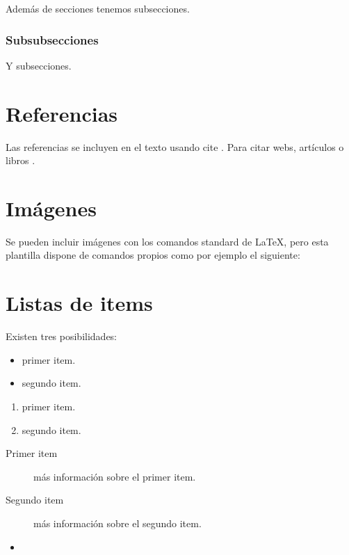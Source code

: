 Además de secciones tenemos subsecciones.

\subsubsection{Subsubsecciones}

Y subsecciones. 


\section{Referencias}

Las referencias se incluyen en el texto usando cite \cite{wiki:latex}. Para citar webs, artículos o libros \cite{koza92}.


\section{Imágenes}

Se pueden incluir imágenes con los comandos standard de \LaTeX, pero esta plantilla dispone de comandos propios como por ejemplo el siguiente:




\section{Listas de items}

Existen tres posibilidades:

\begin{itemize}
	\item primer item.
	\item segundo item.
\end{itemize}

\begin{enumerate}
	\item primer item.
	\item segundo item.
\end{enumerate}

\begin{description}
	\item[Primer item] más información sobre el primer item.
	\item[Segundo item] más información sobre el segundo item.
\end{description}
	
\begin{itemize}
\item 
\end{itemize}

